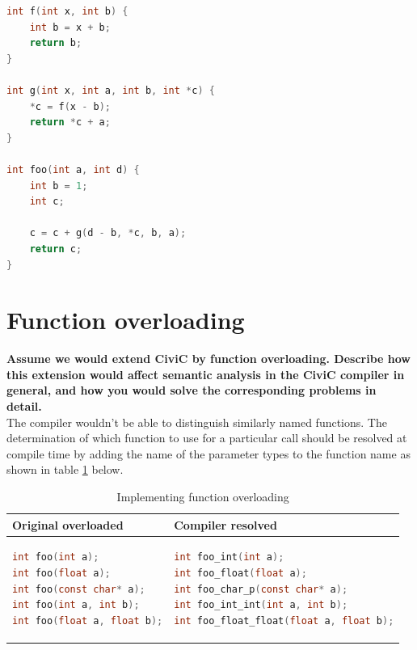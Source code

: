 \documentclass[hidelinks]{uva-inf-article}
\begin{document}
\begin{flushleft}
\begin{lstlisting}[basicstyle=\small, language=C]
int f(int x, int b) {
	int b = x + b;
	return b;
}

int g(int x, int a, int b, int *c) {
	*c = f(x - b);
	return *c + a;
}

int foo(int a, int d) {
	int b = 1;
	int c;

	c = c + g(d - b, *c, b, a);
	return c;
}
\end{lstlisting}
\newpage
\section{Function overloading}
\textbf{Assume we would extend CiviC by function overloading. Describe how 
this extension would affect semantic analysis in the CiviC compiler in general, 
and how you would solve the corresponding problems in detail.\\}
The compiler wouldn't be able to distinguish similarly named functions.
The determination of which function to use for a particular call should 
be resolved at compile time by adding the name of the parameter types to the function name as shown in table \ref{tab:function-overloading} below.
\begin{table}[h!]
  \begin{center}
      \begin{tabular}{l|l} %
          \textbf{Original overloaded} & \textbf{Compiler resolved} \\
          \hline
          \begin{lstlisting}[basicstyle=\small, language=C]
int foo(int a);
int foo(float a);
int foo(const char* a);
int foo(int a, int b);
int foo(float a, float b);
          \end{lstlisting}
            &
          \begin{lstlisting}[basicstyle=\small, language=C]
int foo_int(int a);
int foo_float(float a);
int foo_char_p(const char* a);
int foo_int_int(int a, int b);
int foo_float_float(float a, float b);
          \end{lstlisting}
      \end{tabular}
      \caption{Implementing function overloading}
      \label{tab:function-overloading}
  \end{center}
\end{table}
\end{flushleft}
\end{document}
